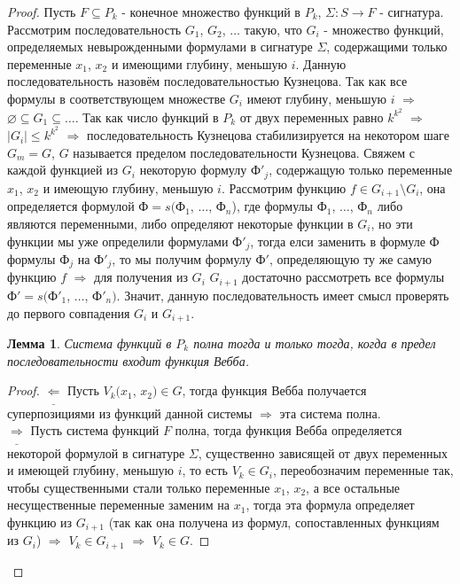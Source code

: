 \documentclass[a4paper, 12pt]{article}
\theoremstyle{definition}
\theoremstyle{plain}
\newtheorem*{lemma}{Лемма}
\theoremstyle{remark}
\begin{document}
  \begin{proof}
    Пусть $F\subseteq P_k$ - конечное множество функций в $P_k$, $\Sigma:S\to F$ - сигнатура. Рассмотрим последовательность $G_1$, $G_2$, $\ldots$ такую, что $G_i$ - множество функций, определяемых невырожденными формулами в сигнатуре $\Sigma$, содержащими только переменные $x_1$, $x_2$ и имеющими глубину, меньшую $i$. Данную последовательность назовём последовательностью Кузнецова. Так как все формулы в соответствующем множестве $G_i$ имеют глубину, меньшую $i$ $\Longrightarrow$ $\varnothing\subseteq G_1\subseteq\ldots$. Так как число функций в $P_k$ от двух переменных равно $k^{k^2}$ $\Longrightarrow$ $|G_i|\leqslant k^{k^2}$ $\Longrightarrow$ последовательность Кузнецова стабилизируется на некотором шаге $G_m=G$, $G$ называется пределом последовательности Кузнецова. Свяжем с каждой функцией из $G_i$ некоторую формулу Ф$'_j$, содержащую только переменные $x_1$, $x_2$ и имеющую глубину, меньшую $i$. Рассмотрим функцию $f\in G_{i+1}\setminus G_i$, она определяется формулой Ф$=s($Ф$_1$, $\ldots$, Ф$_n$), где формулы Ф$_1$, $\ldots$, Ф$_n$ либо являются переменными, либо определяют некоторые функции в $G_i$, но эти функции мы уже определили формулами Ф$'_j$, тогда елси заменить в формуле Ф формулы Ф$_j$ на Ф$'_j$, то мы получим формулу Ф$'$, определяющую ту же самую функцию $f$ $\Longrightarrow$ для получения из $G_i$ $G_{i+1}$ достаточно рассмотреть все формулы Ф$'=s($Ф$'_1$, $\ldots$, Ф$'_n)$. Значит, данную последовательность имеет смысл проверять до первого совпадения $G_i$ и $G_{i+1}$.\\
    \begin{lemma}
      Система функций в $P_k$ полна тогда и только тогда, когда в предел последовательности входит функция Вебба.
    \end{lemma}
    \begin{proof}
      $\underline{\Longleftarrow}$ Пусть $V_k(x_1$, $x_2)\in G$, тогда функция Вебба получается суперпозициями из функций данной системы $\Longrightarrow$ эта система полна.\\
      $\underline{\Longrightarrow}$ Пусть система функций $F$ полна, тогда функция Вебба определяется некоторой формулой в сигнатуре $\Sigma$, существенно зависящей от двух переменных и имеющей глубину, меньшую $i$, то есть $V_k\in G_i$, переобозначим переменные так, чтобы существенными стали только переменные $x_1$, $x_2$, а все остальные несущественные переменные заменим на $x_1$, тогда эта формула определяет функцию из $G_{i+1}$ (так как она получена из формул, сопоставленных функциям из $G_i$) $\Longrightarrow$ $V_k\in G_{i+1}$ $\Longrightarrow$ $V_k\in G$.
    \end{proof}
  \end{proof}
\end{document}
